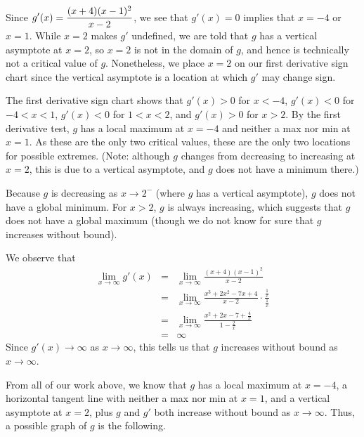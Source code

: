 \begin{activitySolution}
\ba
  \item Since $\displaystyle g'(x) = \frac{(x+4)(x-1)^2}{x-2}$, we see that $g'(x) = 0$ implies that $x = -4$ or $x = 1$.  While $x = 2$ makes $g'$ undefined, we are told that $g$ has a vertical asymptote at $x = 2$, so $x = 2$ is not in the domain of $g$, and hence is technically not a critical value of $g$.  Nonetheless, we place $x = 2$ on our first derivative sign chart since the vertical asymptote is a location at which $g'$ may change sign.
  \item The first derivative sign chart shows that $g'(x) > 0$ for $x < -4$, $g'(x) < 0$ for $-4 < x < 1$, $g'(x) < 0$ for $1 < x < 2$, and $g'(x) > 0$ for $x > 2$.  By the first derivative test, $g$ has a local maximum at $x = -4$ and neither a max nor min at $x = 1$.  As these are the only two critical values, these are the only two locations for possible extremes.  (Note: although $g$ changes from decreasing to increasing at $x = 2$, this is due to a vertical asymptote, and $g$ does not have a minimum there.)
  \item Because $g$ is decreasing as $x \to 2^-$ (where $g$ has a vertical asymptote), $g$ does not have a global minimum.  For $x > 2$, $g$ is always increasing, which suggests that $g$ does not have a global maximum (though we do not know for sure that $g$ increases without bound).
  \item We observe that
  \begin{eqnarray*} 
  	\lim_{x \to \infty} g'(x) & = & \lim_{x \to \infty} \frac{(x+4)(x-1)^2}{x-2} \\
					& = & \lim_{x \to \infty} \frac{x^3 + 2x^2 - 7x + 4}{x-2} \cdot \frac{\frac{1}{x}}{\frac{1}{x}} \\
					& = & \lim_{x \to \infty} \frac{x^2 + 2x - 7 + \frac{4}{x}}{1 - \frac{2}{x}} \\
					& = & \infty
  \end{eqnarray*}
Since $g'(x) \to \infty$ as $x \to \infty$, this tells us that $g$ increases without bound as $x \to \infty$.
  \item From all of our work above, we know that $g$ has a local maximum at $x = -4$, a horizontal tangent line with neither a max nor min at $x = 1$, and a vertical asymptote at $x = 2$, plus $g$ and $g'$ both increase without bound as $x \to \infty$.  Thus, a possible graph of $g$ is the following.
  \begin{center}

\end{center}
\end{activitySolution}
